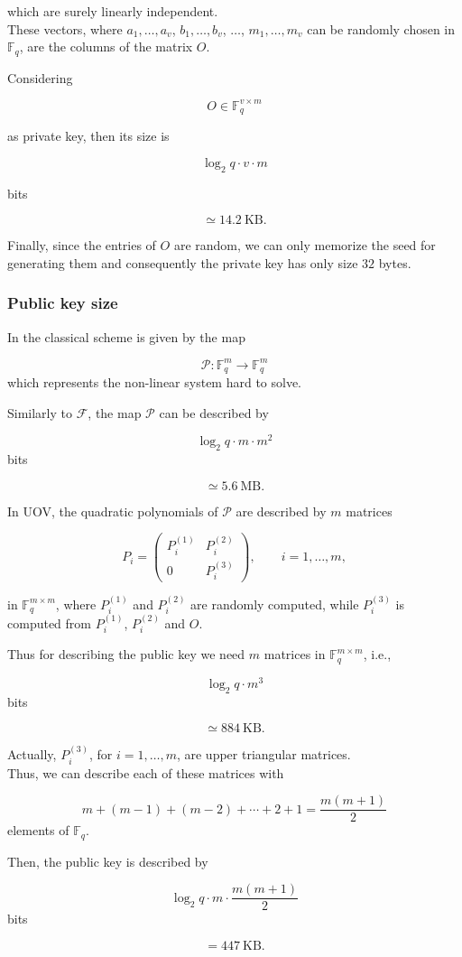 \noindent
which are surely linearly independent.\\
These vectors, where \(a_1,\ldots,a_v\), \(b_1,\ldots,b_v\), \(\ldots\), \(m_1,\ldots,m_v\) can be randomly chosen in \(\mathbb{F}_q\), are the columns of the matrix \(O\).
\medskip

\noindent
Considering

\[
O \in \mathbb{F}_q^{v \times m}
\]

\noindent
as private key, then its size is

\[
\log_2 q \cdot v \cdot m
\]

\noindent
bits

\[
\simeq 14.2 \ \text{KB}.
\]

\noindent
Finally, since the entries of \(O\) are random, we can only memorize the seed for 
generating them and consequently the private key has only size \(32\) bytes.

\subsubsection*{Public key size}
In the classical scheme is given by the map

\[
\mathcal{P} : \mathbb{F}_q^m \longrightarrow \mathbb{F}_q^m
\]
\noindent
which represents the non-linear system hard to solve.
\medskip

\noindent
Similarly to \(\mathcal{F}\), the map \(\mathcal{P}\) can be described by

\[
\log_2 q \cdot m \cdot m^2
\]
\noindent
bits

\[
\simeq 5.6 \ \text{MB}.
\]
\bigskip

\noindent
In UOV, the quadratic polynomials of \(\mathcal{P}\) are described by \(m\) 
matrices

\[
P_i =
\begin{pmatrix}
P_i^{(1)} & P_i^{(2)} \\
0 & P_i^{(3)}
\end{pmatrix},
\qquad i = 1,\ldots,m,
\]

\noindent
in \(\mathbb{F}_q^{m \times m}\), where \(P_i^{(1)}\) and \(P_i^{(2)}\) are 
randomly computed, while \(P_i^{(3)}\) is computed from \(P_i^{(1)}\), 
\(P_i^{(2)}\) and \(O\).

\noindent
Thus for describing the public key we need \(m\) matrices in 
\(\mathbb{F}_q^{m \times m}\), i.e.,

\[
\log_2 q \cdot m^3
\]
\noindent
bits

\[
\simeq 884 \ \text{KB}.
\]

\bigskip

\noindent
Actually, \(P_i^{(3)}\), for \(i=1,\ldots,m\), are upper triangular matrices. \\
Thus, we can describe each of these matrices with

\[
m + (m-1) + (m-2) + \cdots + 2 + 1
=
\frac{m(m+1)}{2}
\]
\noindent
elements of \(\mathbb{F}_q\).
\medskip

\noindent
Then, the public key is described by

\[
\log_2 q \cdot m \cdot \frac{m(m+1)}{2}
\]
\noindent
bits

\[
= 447 \ \text{KB}.
\]
